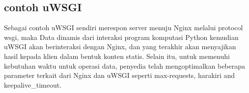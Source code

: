 \subsection{contoh uWSGI}
Sebagai contoh uWSGI sendiri merespon server 	menuju Nginx melalui protocol wsgi, maka Data dinamis dari interaksi program komputasi Python kemudian uWSGI akan berinteraksi dengan Nginx, dan yang terakhir akan menyajikan hasil kepada klien dalam bentuk konten statis. Selain itu, untuk memenuhi kebutuhan waktu untuk operasi data, penyedia  telah mengoptimalkan beberapa parameter terkait dari Nginx dan uWSGI seperti max-requests, harakiri and keepalive_timeout\cite{dong2015chemdes}.



